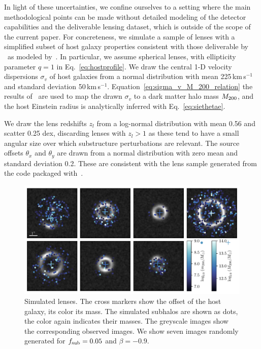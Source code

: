 \documentclass[twocolumn]{aastex62}
\begin{document}

In light of these uncertainties, we confine ourselves to a setting where the main methodological points can be made without detailed modeling of the detector capabilities and the deliverable lensing dataset, which is outside of the scope of the current paper. For concreteness, we simulate a sample of lenses with a simplified subset of host galaxy properties consistent with those deliverable by \Euclid~as modeled by~\citet{2015ApJ...811...20C}. In particular, we assume spherical lenses, with ellipticity parameter $q=1$ in Eq.~\ref{eq:hostprofile}. We draw the central 1-D velocity dispersions $\sigma_v$ of host galaxies from a normal distribution with mean 225\,km\,s$^{-1}$ and standard deviation 50\,km\,s$^{-1}$. Equation~\ref{eq:sigma_v_M_200_relation} the results of~\citet{2018ApJ...859...96Z} are used to map the drawn $\sigma_v$ to a dark matter halo mass $M_{200}$, and the host Einstein radius is analytically inferred with Eq.~\ref{eq:siethetae}.

We draw the lens redshifts $z_l$ from a log-normal distribution with mean 0.56 and scatter 0.25 dex, discarding lenses with $z_l > 1$ as these tend to have a small angular size over which substructure perturbations are relevant. The source offsets $\theta_x$ and $\theta_y$ are drawn from a normal distribution with zero mean and standard deviation 0.2. These are consistent with the lens sample generated from the  code packaged with~\citet{2015ApJ...811...20C}.

\begin{figure}
\centering
\includegraphics[width=1.\textwidth]{figures/simulations}
\caption{Simulated lenses. The cross markers show the offset of the host galaxy, its color its mass. The simulated subhalos are shown as dots, the color again indicates their masses. The greyscale images show the corresponding observed images. We show seven images randomly generated for $f_{\mathrm{sub}} = 0.05$ and $\beta = -0.9$.}
\label{fig:simulations}
\end{figure}
\end{document}

